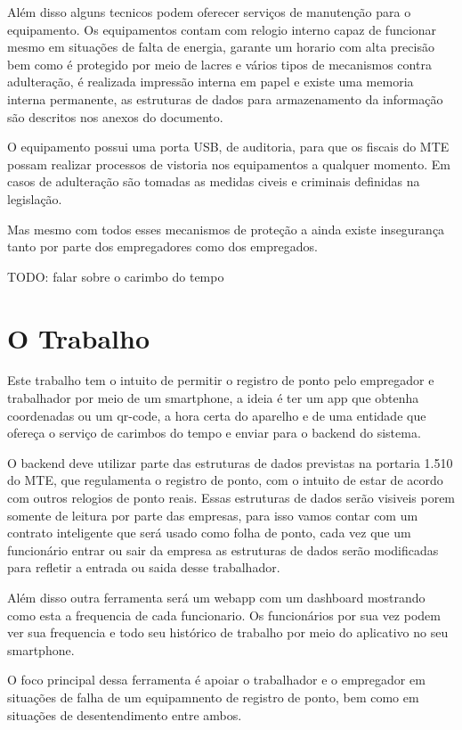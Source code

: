 \documentclass[12pt,openright,twoside,a4paper,english, brazil]{abntex2} %
\begin{document}
Além disso alguns tecnicos podem oferecer serviços de manutenção para o equipamento. Os equipamentos contam com relogio interno capaz de funcionar mesmo em situações de falta de energia, garante um horario com alta precisão bem como é protegido por meio de lacres e vários tipos de mecanismos contra adulteração, é realizada impressão interna em papel e existe uma memoria interna permanente, as estruturas de dados para armazenamento da informação são descritos nos anexos do documento.

O equipamento possui uma porta USB, de auditoria, para que os fiscais do MTE possam realizar processos de vistoria nos equipamentos a qualquer momento. Em casos de adulteração são tomadas as medidas civeis e criminais definidas na legislação. 

Mas mesmo com todos esses mecanismos de proteção a ainda existe insegurança tanto por parte dos empregadores como dos empregados.

TODO: falar sobre o carimbo do tempo

\section{O Trabalho}

Este trabalho tem o intuito de permitir o registro de ponto pelo empregador e trabalhador por meio de um smartphone, a ideia é ter um app que obtenha coordenadas ou um qr-code, a hora certa do aparelho e de uma entidade que ofereça o serviço de carimbos do tempo e enviar para o backend do sistema.

O backend deve utilizar parte das estruturas de dados previstas na portaria 1.510 do MTE, que regulamenta o registro de ponto, com o intuito de estar de acordo com outros relogios de ponto reais. Essas estruturas de dados serão visiveis porem somente de leitura por parte das empresas, para isso vamos contar com um contrato inteligente que será usado como folha de ponto, cada vez que um funcionário entrar ou sair da empresa as estruturas de dados serão modificadas para refletir a entrada ou saida desse trabalhador.

Além disso outra ferramenta será um webapp com um dashboard mostrando como esta a frequencia de cada funcionario. Os funcionários por sua vez podem ver sua frequencia e todo seu histórico de trabalho por meio do aplicativo no seu smartphone.

O foco principal dessa ferramenta é apoiar o trabalhador e o empregador em situações de falha de um equipamnento de registro de ponto, bem como em situações de desentendimento entre ambos.
\end{document}

